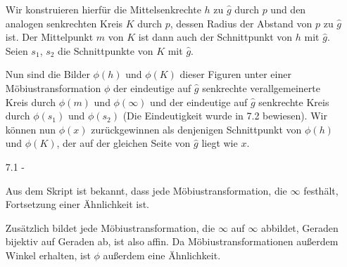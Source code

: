 \documentclass{article}
\begin{document}
\begin{enumerate}
		Wir konstruieren hierfür die Mittelsenkrechte $h$ zu $\hat g$ durch $p$ und den analogen senkrechten Kreis $K$ durch $p$, dessen Radius der Abstand von $p$ zu $\hat g$ ist. Der Mittelpunkt $m$ von $K$ ist dann auch der Schnittpunkt von $h$ mit $\hat g$. Seien $s_1$, $s_2$ die Schnittpunkte von $K$ mit $\hat g$. 
		
		Nun sind die Bilder $\phi(h)$ und $\phi(K)$ dieser Figuren unter einer Möbiustransformation $\phi$ der eindeutige auf $\hat g$ senkrechte verallgemeinerte Kreis durch $\phi(m)$ und $\phi(\infty)$ und der eindeutige auf $\hat g$ senkrechte Kreis durch $\phi(s_1)$ und $\phi(s_2)$ (Die Eindeutigkeit wurde in 7.2 bewiesen). Wir können nun $\phi(x)$ zurückgewinnen als denjenigen Schnittpunkt von $\phi(h)$ und $\phi(K)$, der auf der gleichen Seite von $\hat g$ liegt wie $x$.
		\item[7.1 - \tbf{2}]
		
		Aus dem Skript ist bekannt, dass jede Möbiustransformation, die $\infty$ festhält, Fortsetzung einer Ähnlichkeit ist.
		
		Zusätzlich bildet jede Möbiustransformation, die $\infty$ auf $\infty$ abbildet, Geraden bijektiv auf Geraden ab, ist also affin. Da Möbiustransformationen außerdem Winkel erhalten, ist $\phi$ außerdem eine Ähnlichkeit.
	\end{enumerate}

	\pagebreak
	
\end{document}
